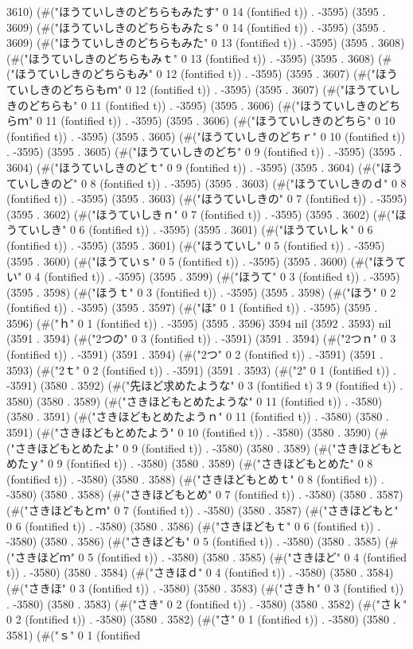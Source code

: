 3610) (#("ほうていしきのどちらもみたす" 0 14 (fontified t)) . -3595) (3595 . 3609) (#("ほうていしきのどちらもみたｓ" 0 14 (fontified t)) . -3595) (3595 . 3609) (#("ほうていしきのどちらもみた" 0 13 (fontified t)) . -3595) (3595 . 3608) (#("ほうていしきのどちらもみｔ" 0 13 (fontified t)) . -3595) (3595 . 3608) (#("ほうていしきのどちらもみ" 0 12 (fontified t)) . -3595) (3595 . 3607) (#("ほうていしきのどちらもｍ" 0 12 (fontified t)) . -3595) (3595 . 3607) (#("ほうていしきのどちらも" 0 11 (fontified t)) . -3595) (3595 . 3606) (#("ほうていしきのどちらｍ" 0 11 (fontified t)) . -3595) (3595 . 3606) (#("ほうていしきのどちら" 0 10 (fontified t)) . -3595) (3595 . 3605) (#("ほうていしきのどちｒ" 0 10 (fontified t)) . -3595) (3595 . 3605) (#("ほうていしきのどち" 0 9 (fontified t)) . -3595) (3595 . 3604) (#("ほうていしきのどｔ" 0 9 (fontified t)) . -3595) (3595 . 3604) (#("ほうていしきのど" 0 8 (fontified t)) . -3595) (3595 . 3603) (#("ほうていしきのｄ" 0 8 (fontified t)) . -3595) (3595 . 3603) (#("ほうていしきの" 0 7 (fontified t)) . -3595) (3595 . 3602) (#("ほうていしきｎ" 0 7 (fontified t)) . -3595) (3595 . 3602) (#("ほうていしき" 0 6 (fontified t)) . -3595) (3595 . 3601) (#("ほうていしｋ" 0 6 (fontified t)) . -3595) (3595 . 3601) (#("ほうていし" 0 5 (fontified t)) . -3595) (3595 . 3600) (#("ほうていｓ" 0 5 (fontified t)) . -3595) (3595 . 3600) (#("ほうてい" 0 4 (fontified t)) . -3595) (3595 . 3599) (#("ほうて" 0 3 (fontified t)) . -3595) (3595 . 3598) (#("ほうｔ" 0 3 (fontified t)) . -3595) (3595 . 3598) (#("ほう" 0 2 (fontified t)) . -3595) (3595 . 3597) (#("ほ" 0 1 (fontified t)) . -3595) (3595 . 3596) (#("ｈ" 0 1 (fontified t)) . -3595) (3595 . 3596) 3594 nil (3592 . 3593) nil (3591 . 3594) (#("2つの" 0 3 (fontified t)) . -3591) (3591 . 3594) (#("2つｎ" 0 3 (fontified t)) . -3591) (3591 . 3594) (#("2つ" 0 2 (fontified t)) . -3591) (3591 . 3593) (#("2ｔ" 0 2 (fontified t)) . -3591) (3591 . 3593) (#("2" 0 1 (fontified t)) . -3591) (3580 . 3592) (#("先ほど求めたような" 0 3 (fontified t) 3 9 (fontified t)) . 3580) (3580 . 3589) (#("さきほどもとめたような" 0 11 (fontified t)) . -3580) (3580 . 3591) (#("さきほどもとめたようｎ" 0 11 (fontified t)) . -3580) (3580 . 3591) (#("さきほどもとめたよう" 0 10 (fontified t)) . -3580) (3580 . 3590) (#("さきほどもとめたよ" 0 9 (fontified t)) . -3580) (3580 . 3589) (#("さきほどもとめたｙ" 0 9 (fontified t)) . -3580) (3580 . 3589) (#("さきほどもとめた" 0 8 (fontified t)) . -3580) (3580 . 3588) (#("さきほどもとめｔ" 0 8 (fontified t)) . -3580) (3580 . 3588) (#("さきほどもとめ" 0 7 (fontified t)) . -3580) (3580 . 3587) (#("さきほどもとｍ" 0 7 (fontified t)) . -3580) (3580 . 3587) (#("さきほどもと" 0 6 (fontified t)) . -3580) (3580 . 3586) (#("さきほどもｔ" 0 6 (fontified t)) . -3580) (3580 . 3586) (#("さきほども" 0 5 (fontified t)) . -3580) (3580 . 3585) (#("さきほどｍ" 0 5 (fontified t)) . -3580) (3580 . 3585) (#("さきほど" 0 4 (fontified t)) . -3580) (3580 . 3584) (#("さきほｄ" 0 4 (fontified t)) . -3580) (3580 . 3584) (#("さきほ" 0 3 (fontified t)) . -3580) (3580 . 3583) (#("さきｈ" 0 3 (fontified t)) . -3580) (3580 . 3583) (#("さき" 0 2 (fontified t)) . -3580) (3580 . 3582) (#("さｋ" 0 2 (fontified t)) . -3580) (3580 . 3582) (#("さ" 0 1 (fontified t)) . -3580) (3580 . 3581) (#("ｓ" 0 1 (fontified 